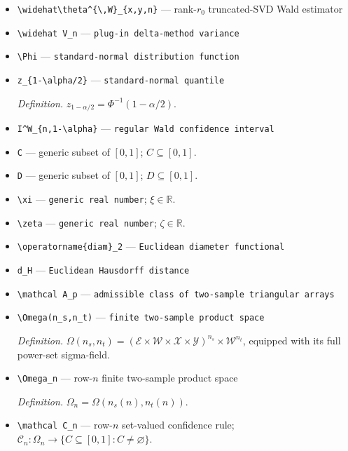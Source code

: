 \documentclass{article}
\begin{document}
\begin{itemize}
  \item \texttt{\textbackslash{}\allowbreak{}widehat\textbackslash{}\allowbreak{}theta\textasciicircum{}\{\textbackslash{}\allowbreak{},\allowbreak{}W\}\allowbreak{}\_\allowbreak{}\{x,\allowbreak{}y,\allowbreak{}n\}\allowbreak{}} --- rank-\(r_0\) truncated-SVD Wald estimator
  \item \texttt{\textbackslash{}\allowbreak{}widehat V\_\allowbreak{}n} --- \texttt{plug-\allowbreak{}in delta-\allowbreak{}method variance}
  \item \texttt{\textbackslash{}\allowbreak{}Phi} --- \texttt{standard-\allowbreak{}normal distribution function}
  \item \texttt{z\_\allowbreak{}\{1-\allowbreak{}\textbackslash{}\allowbreak{}alpha/\allowbreak{}2\}\allowbreak{}} --- \texttt{standard-\allowbreak{}normal quantile}
  \par\smallskip\noindent\emph{Definition.} \(z_{1-\alpha/2}=\Phi^{-1}(1-\alpha/2)\).
  \item \texttt{I\textasciicircum{}W\_\allowbreak{}\{n,\allowbreak{}1-\allowbreak{}\textbackslash{}\allowbreak{}alpha\}\allowbreak{}} --- \texttt{regular Wald confidence interval}
  \item \texttt{C} --- generic subset of \([0,1]\); \(C\subseteq[0,1]\).
  \item \texttt{D} --- generic subset of \([0,1]\); \(D\subseteq[0,1]\).
  \item \texttt{\textbackslash{}\allowbreak{}xi} --- \texttt{generic real number}; \(\xi\in\mathbb R\).
  \item \texttt{\textbackslash{}\allowbreak{}zeta} --- \texttt{generic real number}; \(\zeta\in\mathbb R\).
  \item \texttt{\textbackslash{}\allowbreak{}operatorname\{diam\}\allowbreak{}\_\allowbreak{}2} --- \texttt{Euclidean diameter functional}
  \item \texttt{d\_\allowbreak{}H} --- \texttt{Euclidean Hausdorff distance}
  \item \texttt{\textbackslash{}\allowbreak{}mathcal A\_\allowbreak{}p} --- \texttt{admissible class of two-\allowbreak{}sample triangular arrays}
  \item \texttt{\textbackslash{}\allowbreak{}Omega(n\_\allowbreak{}s,\allowbreak{}n\_\allowbreak{}t)} --- \texttt{finite two-\allowbreak{}sample product space}
  \par\smallskip\noindent\emph{Definition.} \(\Omega(n_s,n_t)=(\mathcal E\times\mathcal W\times\mathcal X\times\mathcal Y)^{n_s}\times\mathcal W^{n_t}\), equipped with its full power-set sigma-field.
  \item \texttt{\textbackslash{}\allowbreak{}Omega\_\allowbreak{}n} --- row-\(n\) finite two-sample product space
  \par\smallskip\noindent\emph{Definition.} \(\Omega_n=\Omega(n_s(n),n_t(n))\).
  \item \texttt{\textbackslash{}\allowbreak{}mathcal C\_\allowbreak{}n} --- row-\(n\) set-valued confidence rule; \(\mathcal C_n:\Omega_n\to\{C\subseteq[0,1]:C\ne\varnothing\}\).
\end{itemize}
\end{document}
